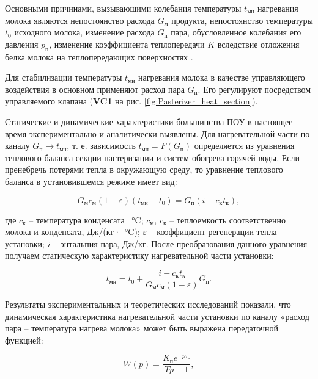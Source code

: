 Основными причинами, вызывающими колебания температуры $t_\text{мн}$ нагревания молока являются непостоянство расхода $G_\text{м}$ продукта, непостоянство температуры $t_0$ исходного молока, изменение расхода $G_\text{п}$ пара, обусловленное колебания его давления $p_\text{п}$, изменение коэффициента теплопередачи $K$ вследствие отложения белка молока на теплопередающих поверхностях \cite{Вайнберг1978}.

Для стабилизации температуры $t_\text{мн}$ нагревания молока в качестве управляющего воздействия в основном применяют расход пара $G_\text{п}$. Его регулируют посредством управляемого клапана (\textbf{VC1} на рис. \ref{fig:Pasterizer_heat_section}).

Статические и динамические характеристики большинства ПОУ в настоящее время экспериментально и аналитически выявлены. Для нагревательной части по каналу $G_\text{п} \rightarrow t_\text{мн}$, т. е. зависимость $t_\text{мн}=F(G_\text{п})$ определяется из уравнения теплового баланса секции пастеризации и систем обогрева горячей воды. Если пренебречь потерями тепла в окружающую среду, то уравнение теплового баланса в установившемся режиме имеет вид:

\begin{equation}
    G_\text{м} c_\text{м}(1 - \varepsilon)(t_\text{мн} - t_0) = G_\text{п}(i - c_\text{к} t_\text{к}),
\end{equation}

где $c_\text{к}$ – температура конденсата \SI{}{\celsius}; $c_\text{м}$, $c_\text{к}$ – теплоемкость соответственно молока и конденсата, Дж/(кг·\SI{}{\celsius}); $\varepsilon$ – коэффициент регенерации тепла установки; $i$ – энтальпия пара, Дж/кг. После преобразования данного уравнения получаем статическую характеристику нагревательной части установки:

\begin{equation}
    t_\text{мн} = t_0 + \frac{i - c_\text{к} t_\text{к}}{G_\text{м} c_\text{м}(1 - \varepsilon)} G_\text{п}.
\end{equation}

Результаты экспериментальных и теоретических исследований показали, что динамическая характеристика нагревательной части установки по каналу «расход пара – температура нагрева молока» может быть выражена передаточной функцией:

\begin{equation}\label{steam_temp_relation}
    W(p) = \frac{K_\text{п} e^{-p \tau_\text{з}}} {Tp + 1},
\end{equation}

